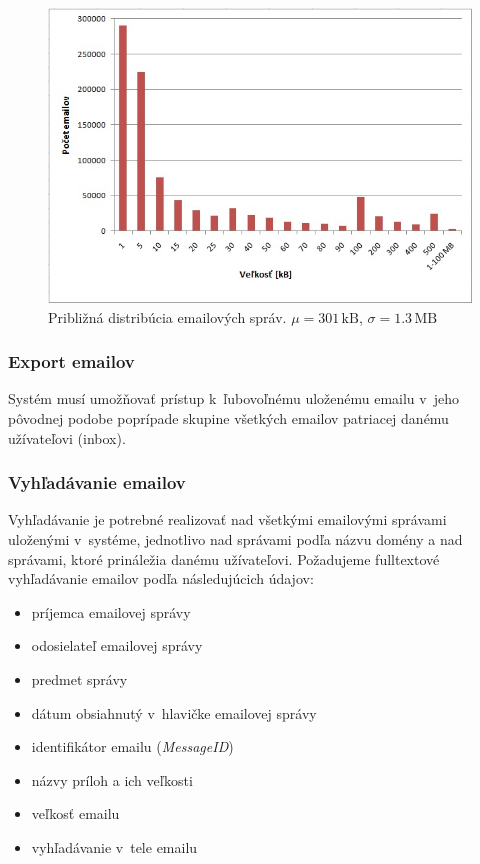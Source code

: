 \documentclass[11pt,twoside,a4paper]{book}
\begin{document}
\begin{figure}[h]
 \centering
 \includegraphics[width=12cm]{./figures/emailsHist.png}
 \caption{Približná distribúcia emailových správ. $\mu = 301\,\mathrm{kB}$, $\sigma = 1.3\,\mathrm{MB}$}
 \label{fig:emailHist}
\end{figure}


\subsubsection*{Export emailov}
Systém musí umožňovať prístup k~ľubovoľnému uloženému emailu v~jeho pôvodnej podobe poprípade skupine všetkých emailov patriacej danému užívateľovi (inbox).

\subsubsection*{Vyhľadávanie emailov}
Vyhľadávanie je potrebné realizovať nad všetkými emailovými správami uloženými v~systéme, jednotlivo nad správami podľa názvu domény a nad správami, ktoré prináležia danému užívateľovi. Požadujeme fulltextové vyhľadávanie emailov podľa následujúcich údajov:
\begin{itemize}
 \item
  príjemca emailovej správy
 \item
  odosielateľ emailovej správy
 \item
  predmet správy
 \item
  dátum obsiahnutý v~hlavičke emailovej správy
 \item
  identifikátor emailu (\emph{MessageID})
 \item
  názvy príloh a ich veľkosti %
 \item
  veľkosť emailu
 \item
  vyhľadávanie v~tele emailu
\end{itemize}
\end{document}
